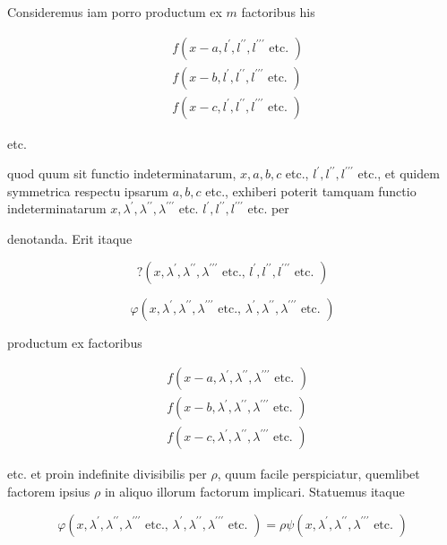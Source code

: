 \documentclass[twoside,12pt, showframe]{memoir}
\begin{document}
Consideremus iam porro productum ex \(m\) factoribus his

\[
\begin{aligned}
& f\left(x-a, l^{\prime}, l^{\prime \prime}, l^{\prime \prime \prime} \text { etc. }\right) \\
& f\left(x-b, l^{\prime}, l^{\prime \prime}, l^{\prime \prime \prime} \text { etc. }\right) \\
& f\left(x-c, l^{\prime}, l^{\prime \prime}, l^{\prime \prime \prime} \text { etc. }\right)
\end{aligned}
\]

etc.

quod quum sit functio indeterminatarum, \(x, a, b, c\) etc., \(l^{\prime}, l^{\prime \prime}, l^{\prime \prime \prime}\) etc., et quidem symmetrica respectu ipsarum \(a, b, c\) etc., exhiberi poterit tamquam functio indeterminatarum \(x, \lambda^{\prime}, \lambda^{\prime \prime}, \lambda^{\prime \prime \prime}\) etc. \(l^{\prime}, l^{\prime \prime}, l^{\prime \prime \prime}\) etc. per

denotanda. Erit itaque

\[
?\left(x, \lambda^{\prime}, \lambda^{\prime \prime}, \lambda^{\prime \prime \prime} \text { etc., } l^{\prime}, l^{\prime \prime}, l^{\prime \prime \prime} \text { etc. }\right)
\]

\[
\varphi\left(x, \lambda^{\prime}, \lambda^{\prime \prime}, \lambda^{\prime \prime \prime} \text { etc., } \lambda^{\prime}, \lambda^{\prime \prime}, \lambda^{\prime \prime \prime} \text { etc. }\right)
\]

productum ex factoribus

\[
\begin{aligned}
& f\left(x-a, \lambda^{\prime}, \lambda^{\prime \prime}, \lambda^{\prime \prime \prime} \text { etc. }\right) \\
& f\left(x-b, \lambda^{\prime}, \lambda^{\prime \prime}, \lambda^{\prime \prime \prime} \text { etc. }\right) \\
& f\left(x-c, \lambda^{\prime}, \lambda^{\prime \prime}, \lambda^{\prime \prime \prime} \text { etc. }\right)
\end{aligned}
\]

etc.
et proin indefinite divisibilis per \(\rho\), quum facile perspiciatur, quemlibet factorem ipsius \(\rho\) in aliquo illorum factorum implicari. Statuemus itaque

\[
\varphi\left(x, \lambda^{\prime}, \lambda^{\prime \prime}, \lambda^{\prime \prime \prime} \text { etc., } \lambda^{\prime}, \lambda^{\prime \prime}, \lambda^{\prime \prime \prime} \text { etc. }\right)=\rho \psi\left(x, \lambda^{\prime}, \lambda^{\prime \prime}, \lambda^{\prime \prime \prime} \text { etc. }\right)
\]
\end{document}
